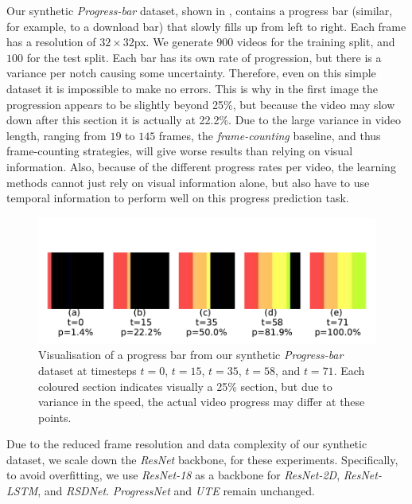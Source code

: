 Our synthetic \textsl{Progress-bar} dataset, shown in , contains a progress bar (similar, for example, to a download bar) that slowly fills up from left to right. 
Each frame has a resolution of $32{\times}32$px. 
We generate $900$ videos for the training split, and $100$ for the test split.
Each bar has its own rate of progression, but there is a variance per notch causing some uncertainty. 
Therefore, even on this simple dataset it is impossible to make no errors.
This is why in the first image the progression appears to be slightly beyond 25\%, but because the video may slow down after this section it is actually at 22.2\%. 
Due to the large variance in video length, ranging from $19$ to $145$ frames, the \textsl{frame-counting} baseline, and thus frame-counting strategies, will give worse results than relying on visual information.
Also, because of the different progress rates per video, the learning methods cannot just rely on visual information alone, but also have to use temporal information to perform well on this progress prediction task. 
\begin{figure}[t]
\begin{center}
   \includegraphics[width=1.0\linewidth]{media/bars.pdf}
\end{center}
   \caption{Visualisation of a progress bar from our synthetic \textsl{Progress-bar} dataset at timesteps $t{=}0$, $t{=}15$, $t{=}35$, $t{=}58$, and $t{=}71$. 
   Each coloured section indicates visually a 25\% section, but due to variance in the speed, the actual video progress may differ at these points.
   }
\label{fig:progressbars}
\end{figure}
Due to the reduced frame resolution and data complexity of our synthetic dataset, we scale down the \textsl{ResNet} backbone, for these experiments. 
Specifically, to avoid overfitting, we use \textsl{ResNet-18} as a backbone for \textsl{ResNet-2D}, \textsl{ResNet-LSTM}, and \textsl{RSDNet}. 
\textsl{ProgressNet} and \textsl{UTE} remain unchanged.


